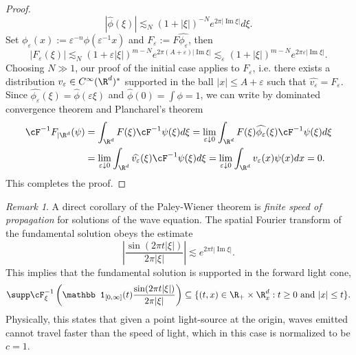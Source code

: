 \documentclass[reqno]{amsart}
\theoremstyle{definition}
\theoremstyle{remark}
\newtheorem*{remark}{Remark}
\renewcommand{\epsilon}{\varepsilon}
\renewcommand{\Im}{\operatorname{Im}}
\begin{document}
\begin{proof}
		\[ |\widehat \phi(\xi)| \lesssim_N (1 + |\xi|)^{-N} e^{2\pi |\Im \xi|} d \xi. \] 
	Set $\phi_\epsilon (x) := \epsilon^{-n} \phi(\epsilon^{-1} x)$ and $F_\epsilon := F \widehat{\phi_\epsilon}$, then 
		\[ |F_\epsilon (\xi)| \lesssim_N (1 + \epsilon |\xi|)^{m - N} e^{2\pi (A + \epsilon) |\Im \xi|} \lesssim_\epsilon (1 + |\xi|)^{m - N} e^{2\pi \epsilon |\Im \xi|}. \]		
	Choosing $N \gg 1$, our proof of the initial case applies to $F_\epsilon$, i.e. there exists a distribution $v_\epsilon \in C^\infty (\R^d)^*$ supported in the ball $|x| \leq A + \epsilon$ such that $\widehat{v_\epsilon} = F_\epsilon$. Since $\widehat{\phi_\epsilon} (\xi) = \widehat{\phi} (\epsilon \xi)$ and $\widehat \phi(0) = \int \phi = 1$, we can write by dominated convergence theorem and Plancharel's theorem 
	\begin{align*}
		\cF^{-1} F_{|\R^d} (\psi) 
			&= \int_{\R^d} F(\xi) \cF^{-1} \psi (\xi) d \xi = \lim_{\epsilon \downarrow 0} \int_{\R^d} F(\xi) \widehat{\phi_\epsilon} (\xi) \cF^{-1} \psi (\xi) d \xi \\
			&= \lim_{\epsilon \downarrow 0} \int_{\R^d} \widehat{v_\epsilon} (\xi) \cF^{-1} \psi (\xi) d \xi = \lim_{\epsilon\downarrow 0} \int_{\R^d} v_\epsilon (x) \psi (x) d x = 0.
	\end{align*}
	This completes the proof. 	
\end{proof}

\begin{remark}
A direct corollary of the Paley-Wiener theorem is \textit{finite speed of propagation} for solutions of the wave equation. The spatial Fourier transform of the fundamental solution obeys the estimate
	\[ \left|\frac{\sin (2\pi t |\xi|)}{2\pi |\xi|}\right| \lesssim  e^{2\pi t |\Im \xi|}. \]
This implies that the fundamental solution is supported in the forward light cone, 
	\[ \supp \cF_\xi^{-1} \left( \mathbb 1_{[0, \infty]} (t) \frac{\sin (2\pi t |\xi|)}{2\pi |\xi|} \right) \subseteq \{ (t, x) \in \R_+ \times \R^d_x : t \geq 0 \text{ and } |x| \leq t \}. \]
Physically, this states that given a point light-source at the origin, waves emitted cannot travel faster than the speed of light, which in this case is normalized to be $c = 1$. 
\end{remark}



\end{document}
